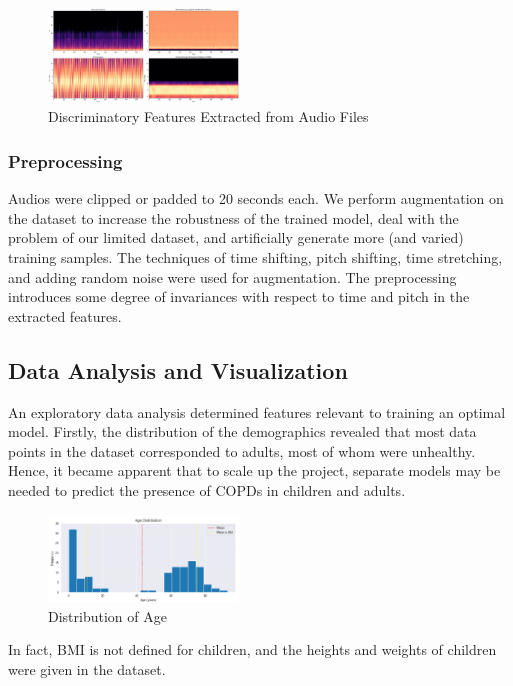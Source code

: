 \documentclass[10pt,twocolumn,letterpaper]{article}
\begin{document}
\begin{figure}[htbp]
    \centerline{\includegraphics[width=0.45\textwidth]{compiled_original.png}}
    \caption{Discriminatory Features Extracted from Audio Files}
    \label{fig:aud_feet}
\end{figure}

\subsubsection*{Preprocessing}
Audios were clipped or padded to 20 seconds each. We perform augmentation on the dataset to increase the robustness of the trained model, deal with the problem of our limited dataset, and artificially generate more (and varied) training samples. The techniques of time shifting, pitch shifting, time stretching, and adding random noise were used for augmentation. The preprocessing introduces some degree of invariances with respect to time and pitch in the extracted features.

\subsection*{Data Analysis and Visualization}
An exploratory data analysis determined features relevant to training an optimal model. Firstly, the distribution of the demographics revealed that most data points in the dataset corresponded to adults, most of whom were unhealthy. Hence, it became apparent that to scale up the project, separate models may be needed to predict the presence of COPDs in children and adults.
\begin{figure}[htbp]
    \centerline{\includegraphics[width=0.45\textwidth]{age_hist.png}}
    \caption{Distribution of Age}
    \label{fig:age_hist}
\end{figure}

In fact, BMI is not defined for children, and the heights and weights of children were given in the dataset.
\end{document}
